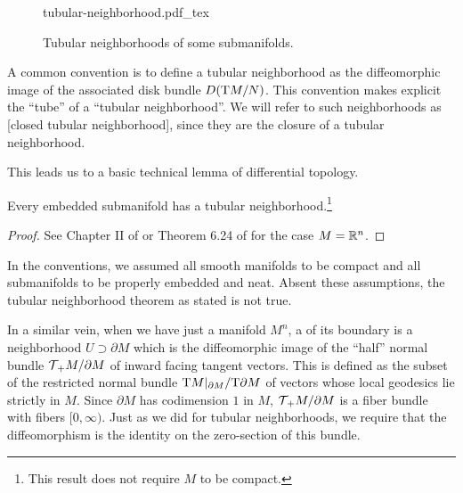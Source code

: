 \begin{figure}[ht]
	\centering
	{tubular-neighborhood.pdf_tex}
	\caption{Tubular neighborhoods of some submanifolds.}\label{fig:tubular-neighborhood}
\end{figure}


\begin{remark*}
	A common convention is to define a tubular neighborhood as the diffeomorphic image of the associated disk bundle ${D}(\mathrm{T} M/N)$. This convention makes explicit the ``tube'' of a  ``tubular neighborhood''. We will refer to such neighborhoods as [closed tubular neighborhood], since they are the closure of a tubular neighborhood.
\end{remark*}

This leads us to a basic technical lemma of differential topology.

\begin{theorem}\label{thm:tubular-neighborhood}
	Every embedded submanifold has a tubular neighborhood.\footnote{This result does not require $M$ to be compact.}
\end{theorem}
\begin{proof}
	See Chapter II of \cite{kosinski1993differential} or Theorem 6.24 of \cite{lee2013smooth} for the case $M=\mathbb{R}^n$.
\end{proof}

\begin{remark*}
	In the conventions, we assumed all smooth manifolds to be compact and all submanifolds to be properly embedded and neat. Absent these assumptions, the tubular neighborhood theorem as stated is not true.
\end{remark*}

In a similar vein, when we have just a manifold $M^n$, a  of its boundary is a neighborhood $U \supset \partial M$ which is the diffeomorphic image of the ``half'' normal bundle ${\mathcal{T}\hspace{-0.1em}}_+ M /\partial M$ of inward facing tangent vectors. This is defined as the subset of the restricted normal bundle $\mathrm{T} M|_{\partial M} / \mathrm{T} \partial M$ of vectors whose local geodesics lie strictly in $M$. Since $\partial M$ has codimension $1$ in $M$, ${\mathcal{T}\hspace{-0.1em}}_+ M /\partial M$ is a fiber bundle with fibers $[0,\infty)$. 
Just as we did for tubular neighborhoods, we require that the diffeomorphism is the identity on the zero-section of this bundle.

